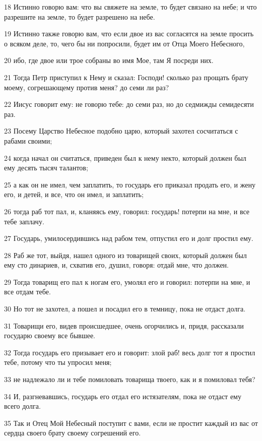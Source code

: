 \par 18 Истинно говорю вам: что вы свяжете на земле, то будет связано на небе; и что разрешите на земле, то будет разрешено на небе.
\par 19 Истинно также говорю вам, что если двое из вас согласятся на земле просить о всяком деле, то, чего бы ни попросили, будет им от Отца Моего Небесного,
\par 20 ибо, где двое или трое собраны во имя Мое, там Я посреди них.
\par 21 Тогда Петр приступил к Нему и сказал: Господи! сколько раз прощать брату моему, согрешающему против меня? до семи ли раз?
\par 22 Иисус говорит ему: не говорю тебе: до семи раз, но до седмижды семидесяти раз.
\par 23 Посему Царство Небесное подобно царю, который захотел сосчитаться с рабами своими;
\par 24 когда начал он считаться, приведен был к нему некто, который должен был ему десять тысяч талантов;
\par 25 а как он не имел, чем заплатить, то государь его приказал продать его, и жену его, и детей, и все, что он имел, и заплатить;
\par 26 тогда раб тот пал, и, кланяясь ему, говорил: государь! потерпи на мне, и все тебе заплачу.
\par 27 Государь, умилосердившись над рабом тем, отпустил его и долг простил ему.
\par 28 Раб же тот, выйдя, нашел одного из товарищей своих, который должен был ему сто динариев, и, схватив его, душил, говоря: отдай мне, что должен.
\par 29 Тогда товарищ его пал к ногам его, умолял его и говорил: потерпи на мне, и все отдам тебе.
\par 30 Но тот не захотел, а пошел и посадил его в темницу, пока не отдаст долга.
\par 31 Товарищи его, видев происшедшее, очень огорчились и, придя, рассказали государю своему все бывшее.
\par 32 Тогда государь его призывает его и говорит: злой раб! весь долг тот я простил тебе, потому что ты упросил меня;
\par 33 не надлежало ли и тебе помиловать товарища твоего, как и я помиловал тебя?
\par 34 И, разгневавшись, государь его отдал его истязателям, пока не отдаст ему всего долга.
\par 35 Так и Отец Мой Небесный поступит с вами, если не простит каждый из вас от сердца своего брату своему согрешений его.

